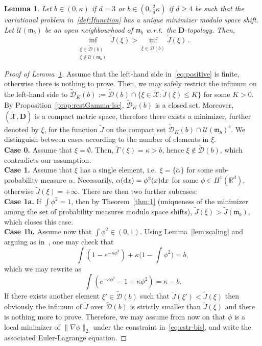 \documentclass[a4paper,11pt]{amsart}
\numberwithin{equation}{section}
\newtheorem{lemma}[theorem]{Lemma}
\newcommand{\bbR}{{\ensuremath{\mathbb R}} }
\newcommand{\cD}{{\ensuremath{\mathcal D}} }
\newcommand{\cU}{{\ensuremath{\mathcal U}} }
\newcommand{\cX}{{\ensuremath{\mathcal X}} }
\newcommand{\ga}{\alpha}
\newcommand{\gk}{\kappa}
\newcommand{\bfD}{\mathbf{D}}
\renewcommand{\tilde}{\widetilde}          %
\newcommand{\dd}{\text{\rm d}}             %
\newcommand{\inftwo}[2]{\inf_{\substack{#1 \\ #2}}} %
\newcommand{\8}{\infty}
\newcommand{\beq}{\begin{equation}}
\newcommand{\eeq}{\end{equation}}
\newcommand{\fm}{\mathfrak{m}}
\begin{document}
%
\begin{lemma}
	\label{lem:positive}
Let $b\in(0,\kappa)$ if $d=3$ or $b\in(0,\tfrac 2 d \kappa)$ if $d\ge 4$ be such that the variational problem in~\eqref{def:Ifunction} has a unique minimizer modulo space shift. Let $\cU(\fm_b)$ be an open neighbourhood of $\fm_b$ w.r.t.\ the $\bfD$-topology. Then,
\beq\label{eq:positive}
\inftwo{\xi \in \tilde \cD(b)}{\xi \notin \cU(\fm_b)} \tilde J(\xi)
>\inf_{\xi \in \tilde\cD(b)} \tilde J(\xi)\,.
\eeq
\end{lemma}
%
\begin{proof}[Proof of Lemma~\ref{lem:positive}] Assume that the left-hand side in~\eqref{eq:positive} is finite, otherwise there is nothing to prove. Then, we may safely restrict the infimum on the left-hand side to $\tilde \cD_K(b) := \tilde \cD(b) \cap \{\xi \in \tilde \cX\colon \tilde J(\xi)\le K\}$ for some $K>0$. By Proposition~\ref{prop:restGamma-lsc}, $\tilde \cD_K(b)$ is a closed set. Moreover, $(\tilde \cX, \bfD)$ is a compact metric space, therefore there exists a minimizer, further denoted by $\xi$, for the function $\tilde J$ on the compact set $\tilde\cD_K(b) \cap \cU(\fm_b)^c$. We distinguish between cases according to the number of elements in $\xi$.\\
{\bf \noindent Case 0.} Assume that $\xi = \emptyset$. Then, $\tilde\Gamma(\xi)=\gk>b$, hence $\xi \notin \tilde\cD(b)$, which contradicts our assumption.\\
{\bf \noindent Case 1.} Assume that $\xi$ has a single element, i.e.\ $\xi = \{\tilde\ga\}$ for some sub-probability measure $\ga$. Necessarily, $\ga(\dd x) = \phi^2(x)\dd x$ for some $\phi\in H^1(\bbR^d)$, otherwise $\tilde J(\xi) = +\infty$. There are then two further subcases:\\
{\bf \noindent Case 1a.}
If $\int \phi^2 = 1$, then by Theorem~\ref{thm:1} (uniqueness of the minimizer among the set of probability measures modulo space shifts), $\tilde J(\xi) > \tilde J(\fm_b)$, which closes this case.\\
{\bf \noindent Case 1b.}
Assume now that $\int \phi^2 \in (0,1)$. Using Lemma~\ref{lem:scaling} and arguing as in~\cite[Proof of Lemma 12]{BBH2001}, one may check that
\beq
\label{eq:cstr}
\int (1- e^{-\gk \phi^2}) + \kappa\Big(1-{\int} \phi^2\Big) = b,
\eeq
which we may rewrite as
\beq
\label{eq:cstr-bis}
\int (e^{-\kappa \phi^2} - 1 + \kappa \phi^2) = \kappa - b.
\eeq
If there exists another element $\xi'\in\tilde\cD(b)$ such that $\tilde J(\xi')< \tilde J(\xi)$ then obviously the infimum of $\tilde J$ over $\tilde \cD(b)$ is strictly smaller than $\tilde J(\xi)$ and there is nothing more to prove. Therefore, we may assume from now on that $\phi$ is a local minimizer of $\|\nabla\phi\|_2$ under the constraint in~\eqref{eq:cstr-bis}, and write the associated Euler-Lagrange equation.

\end{proof}
\end{document}
